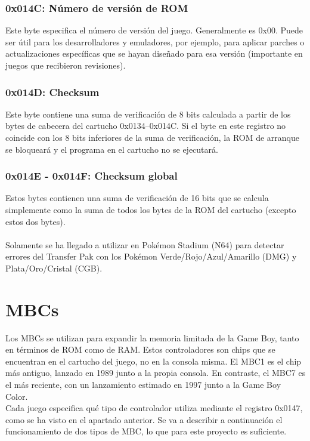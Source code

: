 \subsubsection{0x014C: Número de versión de ROM}
Este byte especifica el número de versión del juego. Generalmente es 0x00. Puede ser útil para los desarrolladores y emuladores, por ejemplo, para aplicar parches o actualizaciones específicas que se hayan diseñado para esa versión (importante en juegos que recibieron revisiones).

\subsubsection{0x014D: Checksum}
Este byte contiene una suma de verificación de 8 bits calculada a partir de los bytes de cabecera del cartucho 0x0134–0x014C. Si el byte en este registro no coincide con los 8 bits inferiores de la suma de verificación, la ROM de arranque se bloqueará y el programa en el cartucho no se ejecutará.

\subsubsection{0x014E - 0x014F: Checksum global}
Estos bytes contienen una suma de verificación de 16 bits que se calcula simplemente como la suma de todos los bytes de la ROM del cartucho (excepto estos dos bytes).\\\\
Solamente se ha llegado a utilizar en Pokémon Stadium (N64) para detectar errores del Transfer Pak con los Pokémon Verde/Rojo/Azul/Amarillo (DMG) y Plata/Oro/Cristal (CGB).

\section{MBCs}
\label{history_mbcs}

Los MBCs se utilizan para expandir la memoria limitada de la Game Boy, tanto en términos de ROM como de RAM. Estos controladores son chips que se encuentran en el cartucho del juego, no en la consola misma. El MBC1 es el chip más antiguo, lanzado en 1989 junto a la propia consola. En contraste, el MBC7 es el más reciente, con un lanzamiento estimado en 1997 junto a la Game Boy Color.
\\
Cada juego especifica qué tipo de controlador utiliza mediante el registro 0x0147, como se ha visto en el apartado anterior. Se va a describir a continuación el funcionamiento de dos tipos de MBC, lo que para este proyecto es suficiente.

